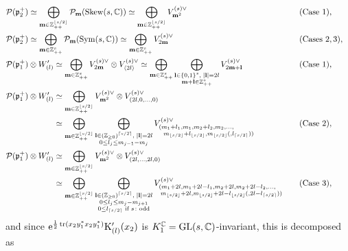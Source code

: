 \documentclass[pdftex]{sigma}
\numberwithin{equation}{section}
\newcommand{\bl}{\mathbf{l}}
\newcommand{\bm}{\mathbf{m}}
\newcommand{\BZ}{\mathbb{Z}}
\newcommand{\BC}{\mathbb{C}}
\newcommand{\fp}{\mathfrak{p}}
\newcommand{\cP}{\mathcal{P}}
\newcommand{\rK}{\mathrm{K}}
\newcommand{\tr}{\operatorname{tr}}
\newcommand{\Sym}{\operatorname{Sym}}
\newcommand{\Skew}{\operatorname{Skew}}
\begin{document}
\begin{alignat*}{3}
& \cP(\fp^+_2) \simeq\bigoplus_{\bm\in\BZ_{++}^{\lfloor s/2\rfloor}}\cP_\bm(\Skew(s,\BC))
\simeq\bigoplus_{\bm\in\BZ_{++}^{\lfloor s/2\rfloor}}V_{\bm^2}^{(s)\vee} \quad & &(\text{Case }1),& \\
& \cP(\fp^+_2) \simeq\bigoplus_{\bm\in\BZ_{++}^s}\cP_\bm(\Sym(s,\BC))
\simeq\bigoplus_{\bm\in\BZ_{++}^s}V_{2\bm}^{(s)\vee} \quad & &(\text{Cases }2,3), \\
& \cP(\fp^+_1)\otimes W_{(l)}'
 \simeq \bigoplus_{\bm\in\BZ_{++}^s}V_{2\bm}^{(s)\vee}\otimes V_{\langle 2l\rangle}^{(s)\vee}
\simeq \bigoplus_{\bm\in\BZ_{++}^s}\bigoplus_{\substack{\bl\in\{0,1\}^s,\; |\bl|=2l\\ \bm+\bl\in\BZ_{++}^s}}V_{2\bm+\bl}^{(s)\vee}\quad &&(\text{Case }1),& \\
& \cP(\fp^+_1)\otimes W_{(l)}' \simeq \bigoplus_{\bm\in\BZ_{++}^{\lfloor s/2\rfloor}}V_{\bm^2}^{(s)\vee}\otimes V_{(2l,0,\ldots,0)}^{(s)\vee}&&& \\
&\hphantom{\cP(\fp^+_1)\otimes W_{(l)}'}{} \simeq \bigoplus_{\bm\in\BZ_{++}^{\lfloor s/2\rfloor}}
\bigoplus_{\substack{\bl\in(\BZ_{\ge 0})^{\lceil s/2\rceil},\; |\bl|=2l\\ 0\le l_j\le m_{j-1}-m_j}}
V_{\substack{(m_1+l_1,m_1,m_2+l_2,m_2,\ldots,\hspace{30pt}\\ m_{\lfloor s/2\rfloor}+l_{\lfloor s/2\rfloor},m_{\lfloor s/2\rfloor}
(,l_{\lceil s/2\rceil}))}}^{(s)\vee} \quad & &(\text{Case }2), & \\
&\cP(\fp^+_1)\otimes W_{(l)}' \simeq \bigoplus_{\bm\in\BZ_{++}^{\lfloor s/2\rfloor}}V_{\bm^2}^{(s)\vee}\otimes V_{(2l,\ldots,2l,0)}^{(s)\vee}&&&\\
&\hphantom{\cP(\fp^+_1)\otimes W_{(l)}'}{} \simeq \bigoplus_{\bm\in\BZ_{++}^{\lfloor s/2\rfloor}}
\bigoplus_{\substack{\bl\in(\BZ_{\ge 0})^{\lceil s/2\rceil},\; |\bl|=2l\\ 0\le l_j\le m_j-m_{j+1}\\
0\le l_{\lceil s/2\rceil} \text{ if }s\colon \text{odd}}}
V_{\substack{(m_1+2l,m_1+2l-l_1,m_2+2l,m_2+2l-l_2,\ldots,\hspace{10pt}\\
m_{\lfloor s/2\rfloor}+2l,m_{\lfloor s/2\rfloor}+2l-l_{\lfloor s/2\rfloor}(,2l-l_{\lceil s/2\rceil}))}}^{(s)\vee} \quad\! && (\text{Case }3),&
\end{alignat*}
and since ${\rm e}^{\frac{1}{2}\tr(x_2y_1^*x_2y_1^*)}\rK_{(l)}'(x_2)$ is $K_1^\BC={\rm GL}(s,\BC)$-invariant, this is decomposed as
\end{document}
